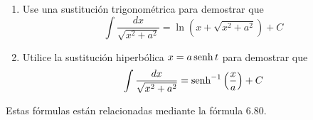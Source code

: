 \item 
    \begin{enumerate}
        \item[(a)] Use una sustitución trigonométrica para demostrar que
        \[ \int \frac{dx}{\sqrt{x^2 + a^2}} = \ln(x + \sqrt{x^2 + a^2}) + C \]
        \item[(b)] Utilice la sustitución hiperbólica $x = a \operatorname{senh} t$ para demostrar que
        \[ \int \frac{dx}{\sqrt{x^2 + a^2}} = \operatorname{senh}^{-1}\left(\frac{x}{a}\right) + C \]
    \end{enumerate}
    Estas fórmulas están relacionadas mediante la fórmula 6.80.

